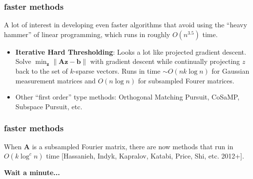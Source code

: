 \documentclass[compress]{beamer}
\newcommand{\bv}[1]{\mathbf{#1}}
\begin{document}
	\begin{frame}
		\frametitle{faster methods}
		A lot of interest in developing even faster algorithms that avoid using the ``heavy hammer'' of linear programming, which runs in roughly $O(n^{3.5})$ time. 
		
		\begin{itemize}
			\item \textbf{Iterative Hard Thresholding}: Looks a lot like projected gradient descent. Solve $\min_{\bv{z}} \|\bv{Az} - \bv{b}\|$ with gradient descent while continually projecting $z$ back to the set of $k$-sparse vectors. Runs in time \alert{$\sim O(n k\log n)$} for Gaussian measurement matrices and \alert{$O(n\log n)$} for subsampled Fourer matrices.
			\item Other ``first order'' type methods: Orthogonal Matching Pursuit, CoSaMP, Subspace Pursuit, etc.
		\end{itemize}
		
	\end{frame}
	
	\begin{frame}
		\frametitle{faster methods}
		When $\bv{A}$ is a subsampled Fourier matrix, there are now methods that run in \alert{\emph{$O(k\log^c n)$}} time [Hassanieh, Indyk, Kapralov, Katabi, Price, Shi, etc. 2012+].
		
		\begin{center}
			\textbf{Wait a minute...}
		\end{center}
		
	\end{frame}
	
\end{document}
